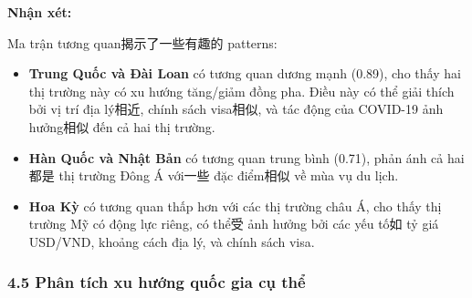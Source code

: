 \documentclass[11pt]{article}
\begin{document}
    \textbf{Nhận xét:}

Ma trận tương quan揭示了一些有趣的 patterns:

\begin{itemize}
\item
  \textbf{Trung Quốc và Đài Loan} có tương quan dương mạnh (0.89), cho
  thấy hai thị trường này có xu hướng tăng/giảm đồng pha. Điều này có
  thể giải thích bởi vị trí địa lý相近, chính sách visa相似, và tác động
  của COVID-19 ảnh hưởng相似 đến cả hai thị trường.
\item
  \textbf{Hàn Quốc và Nhật Bản} có tương quan trung bình (0.71), phản
  ánh cả hai都是 thị trường Đông Á với一些 đặc điểm相似 về mùa vụ du
  lịch.
\item
  \textbf{Hoa Kỳ} có tương quan thấp hơn với các thị trường châu Á, cho
  thấy thị trường Mỹ có động lực riêng, có thể受 ảnh hưởng bởi các yếu
  tố如 tỷ giá USD/VND, khoảng cách địa lý, và chính sách visa.
\end{itemize}

\subsubsection{4.5 Phân tích xu hướng quốc gia cụ
thể}\label{phuxe2n-tuxedch-xu-hux1b0ux1edbng-quux1ed1c-gia-cux1ee5-thux1ec3}
\end{document}
